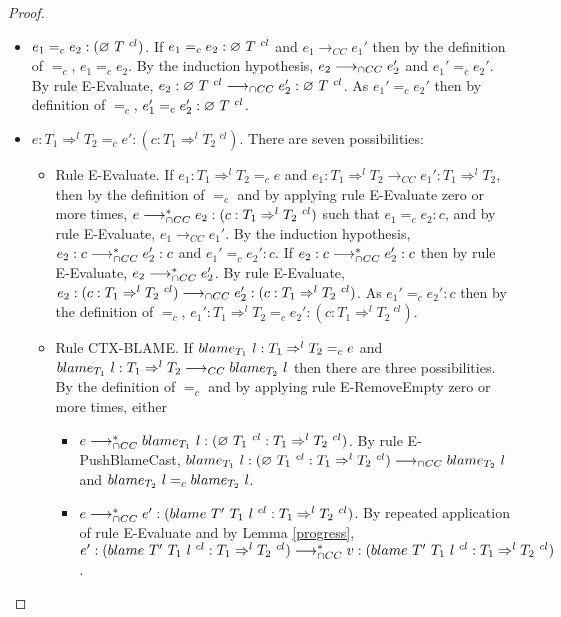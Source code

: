 \documentclass[a4paper]{article}
\begin{document}
\begin{proof}
\begin{itemize}
\begin{itemize}
    \end{itemize}
    \item $e_1 =_c e_2 : (\varnothing\ T\ ^{cl})$.
    If $e_1 =_c e_2 : \varnothing\ T\ ^{cl}$ and $e_1 \longrightarrow_{CC} e_1'$ then by the definition of $=_c$, $e_1 =_c e_2$.
    By the induction hypothesis, $e_2 \longrightarrow_{\cap CC} e_2'$ and $e_1' =_c e_2'$.
    By rule E-Evaluate, $e_2 : \varnothing\ T\ ^{cl} \longrightarrow_{\cap CC} e_2' : \varnothing\ T\ ^{cl}$.
    As $e_1' =_c e_2'$ then by definition of $=_c$, $e_1' =_c e_2' : \varnothing\ T\ ^{cl}$.
    \item $e : T_1 \Rightarrow^l T_2 =_c e' : (c : T_1 \Rightarrow^l T_2\ ^{cl})$.
    There are seven possibilities:
    \begin{itemize}
        \item Rule E-Evaluate.
        If $e_1 : T_1 \Rightarrow^l T_2 =_c e$ and $e_1 : T_1 \Rightarrow^l T_2 \longrightarrow_{CC} e_1' : T_1 \Rightarrow^l T_2$, then by the definition of $=_c$ and by applying rule E-Evaluate zero or more times, $e \gios^* e_2 : (c : T_1 \Rightarrow^l T_2\ ^{cl})$ such that $e_1 =_c e_2 : c$, and by rule E-Evaluate, $e_1 \longrightarrow_{CC} e_1'$.
        By the induction hypothesis, $e_2 : c \longrightarrow_{\cap CC}^* e_2' : c$ and $e_1' =_c e_2' : c$.
        If $e_2 : c \longrightarrow_{\cap CC}^* e_2' : c$ then by rule E-Evaluate, $e_2 \longrightarrow_{\cap CC}^* e_2'$.
        By rule E-Evaluate, $e_2 : (c : T_1 \Rightarrow^l T_2\ ^{cl}) \longrightarrow_{\cap CC} e_2' : (c : T_1 \Rightarrow^l T_2\ ^{cl})$.
        As $e_1' =_c e_2' : c$ then by the definition of $=_c$, $e_1' : T_1 \Rightarrow^l T_2 =_c e_2' : (c : T_1 \Rightarrow^l T_2\ ^{cl})$.
        \item Rule CTX-BLAME.
        If $blame_{T_1}\ l : T_1 \Rightarrow^l T_2 =_c e$ and $blame_{T_1}\ l : T_1 \Rightarrow^l T_2 \longrightarrow_{CC} blame_{T_2}\ l$ then there are three possibilities.
        By the definition of $=_c$ and by applying rule E-RemoveEmpty zero or more times, either
        \begin{itemize}
            \item $e \longrightarrow_{\cap CC}^* blame_{T_1}\ l : (\varnothing\ T_1\ ^{cl} : T_1 \Rightarrow^l T_2\ ^{cl})$.
            By rule E-PushBlameCast, $blame_{T_1}\ l : (\varnothing\ T_1\ ^{cl} : T_1 \Rightarrow^l T_2\ ^{cl}) \longrightarrow_{\cap CC} blame_{T_2}\ l$ and $blame_{T_2}\ l =_c blame_{T_2}\ l$.
            \item $e \longrightarrow_{\cap CC}^* e' : (blame\ T'\ T_1\ l\ ^{cl} : T_1 \Rightarrow^l T_2\ ^{cl})$.
            By repeated application of rule E-Evaluate and by Lemma \ref{progress}, $e' : (blame\ T'\ T_1\ l\ ^{cl} : T_1 \Rightarrow^l T_2\ ^{cl}) \longrightarrow_{\cap CC}^* v : (blame\ T'\ T_1\ l\ ^{cl} : T_1 \Rightarrow^l T_2\ ^{cl})$.

\end{itemize}
\end{itemize}
\end{itemize}
\end{proof}
\end{document}
